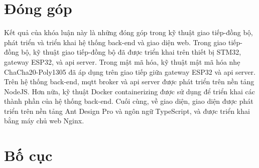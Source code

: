 \section{Đóng góp}

Kết quả của khóa luận này là những đóng góp trong kỹ thuật giao tiếp-đồng bộ, phát triển và triển khai hệ thống back-end và giao diện web. Trong giao tiếp-đồng bộ, kỹ thuật giao tiếp-đồng bộ đã được triển khai trên thiết bị STM32, gateway ESP32, và \acrshort{api} server. Trong mật mã hóa, kỹ thuật mật mã hóa nhẹ ChaCha20-Poly1305 đã áp dụng trên giao tiếp giữa gateway ESP32 và \acrshort{api} server. Trên hệ thống back-end, \acrshort{mqtt} broker và \acrshort{api} server được phát triển trên nền tảng NodeJS. Hơn nữa, kỹ thuật Docker containerizing được sử dụng để triển khai các thành phần của hệ thống back-end. Cuối cùng, về giao diện, giao diện được phát triển trên nền tảng Ant Design Pro và ngôn ngữ TypeScript, và được triển khai bằng máy chủ web Nginx.

\section{Bố cục}


